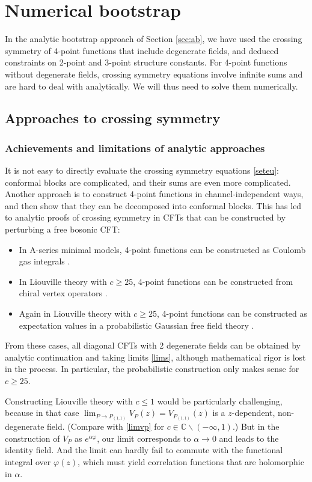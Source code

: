 \documentclass[12pt, a4paper]{article}
\begin{document}
\section{Numerical bootstrap}

In the analytic bootstrap approach of Section \ref{sec:ab}, we have used the crossing symmetry of 4-point functions that include degenerate fields, and deduced constraints on 2-point and 3-point structure constants. For 4-point functions without degenerate fields, crossing symmetry equations involve infinite sums and are hard to deal with analytically. We will thus need to solve them numerically. 

\subsection{Approaches to crossing symmetry}

\subsubsection{Achievements and limitations of analytic approaches}\label{sec:alaa}

It is not easy to directly evaluate the crossing symmetry equations \eqref{seteu}: conformal blocks are complicated, and their sums are even more complicated. Another approach is to construct 4-point functions in channel-independent ways, and then show that they can be decomposed into conformal blocks. This has led to analytic proofs of crossing symmetry in CFTs that can be constructed by perturbing a free bosonic CFT:
\begin{itemize}
 \item In A-series minimal models, 4-point functions can be constructed as Coulomb gas integrals \cite{df84}.
 \item In Liouville theory with $c\geq 25$, 4-point functions can be constructed from chiral vertex operators \cite{tes03b}.
 \item Again in Liouville theory with $c\geq 25$, 4-point functions can be constructed as expectation values in a probabilistic Gaussian free field theory \cite{ckrv05}. 
\end{itemize}
From these cases, all diagonal CFTs with 2 degenerate fields can be obtained by analytic continuation and taking limits \eqref{lims}, although mathematical rigor is lost in the process. In particular, the probabilistic construction only makes sense for $c\geq 25$.

Constructing Liouville theory with $c\leq 1$ would be particularly challenging, because in that case $\lim_{P\to P_{(1,1)}}V_P(z) = V_{P_{(1,1)}}(z)$ is a $z$-dependent, non-degenerate field. (Compare with \eqref{limvp} for $c\in\mathbb{C}\backslash(-\infty, 1)$.) But in the construction of $V_P$ as $e^{\alpha\varphi}$, our limit corresponds to $\alpha\to 0$ and leads to the identity field. And the limit can hardly fail to commute with the functional integral over $\varphi(z)$, which must yield correlation functions that are holomorphic in $\alpha$.
\end{document}
